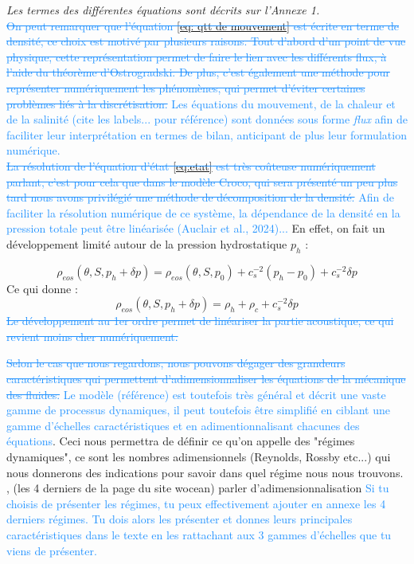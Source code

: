 \documentclass{rapportECC}
\newcommand{\FAadd}[1]{\textcolor{DodgerBlue}{{#1}}}                     %
\newcommand{\FAdel}[1]{\textcolor{DodgerBlue}{\sout{#1}}}                %
\begin{document}
\textit{Les termes des différentes équations  sont décrits sur l'Annexe 1.}
\\
\FAdel{On peut remarquer que l'équation \eqref{eq: qtt de mouvement} est écrite en terme de densité, ce choix est motivé par plusieurs raisons. Tout d'abord d'un point de vue physique, cette représentation permet de faire le lien avec les différents flux, à l'aide du théorème d'Ostrogradski. De plus, c'est également une méthode pour représenter numériquement les phénomènes, qui permet d'éviter certaines problèmes liés à la discrétisation.} \FAadd{Les équations du mouvement, de la chaleur et de la salinité (cite les labels... pour référence) sont données sous forme \textit{flux} afin de faciliter leur interprétation en termes de bilan, anticipant de plus leur formulation numérique.} \\

\vspace{0.5 cm}
\FAdel{La résolution de l'équation d'état \eqref{eq:etat} est très coûteuse numériquement parlant, c'est pour cela que dans le modèle Croco, qui sera présenté un peu plus tard nous avons privilégié une méthode de décomposition de la densité.} \FAadd{Afin de faciliter la résolution numérique de ce système, la dépendance de la densité en la pression totale peut être linéarisée (Auclair et al., 2024)...} En effet, on fait un développement limité autour de la pression hydrostatique $p_h$ :

\begin{equation}
    \rho_{eos}(\theta, S, p_h +\delta p) = \rho_{eos}(\theta, S, p_0) + c_s^{-2}(p_h - p_0) + c_s^{-2}\delta p
\end{equation}
Ce qui donne :
\begin{equation}
     \rho_{eos}(\theta, S, p_h +\delta p) =  \rho_h + \rho_c + c_s^{-2}\delta p
     \label{eq:decomp densite}
\end{equation}
\FAdel{Le développement au 1er ordre permet de linéariser la partie acoustique, ce qui revient moins cher numériquement.}
\vspace{0.5 cm}

\FAdel{Selon le cas que nous regardons, nous pouvons dégager des grandeurs caractéristiques qui permettent d'adimensionnaliser les équations de la mécanique des fluides.} \FAadd{Le modèle (référence) est toutefois très général et décrit une vaste gamme de processus dynamiques, il peut toutefois être simplifié en ciblant une gamme d'échelles caractéristiques et en adimentionnalisant chacunes des équations}. Ceci nous permettra de définir ce qu'on appelle des "régimes dynamiques", ce sont les nombres adimensionnels (Reynolds, Rossby etc...) qui nous donnerons des indications pour savoir dans quel régime nous nous trouvons.
, (les 4 derniers de la page du site wocean)
parler d'adimensionnalisation
\FAadd{Si tu choisis de présenter les régimes, tu peux effectivement ajouter en annexe les 4 derniers régimes. Tu dois alors les présenter et donnes leurs principales caractéristiques dans le texte en les rattachant aux 3 gammes d'échelles que tu viens de présenter.}
\end{document}
